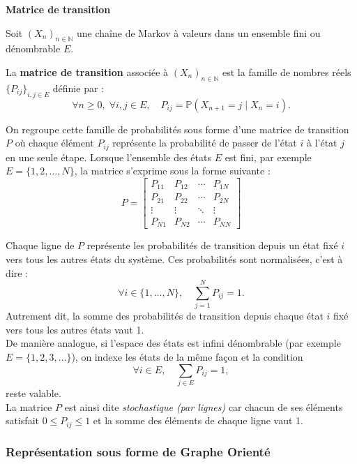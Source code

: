 \documentclass{article}
\begin{document}
\noindent\textbf{Matrice de transition}
\begin{leftbar}
Soit $(X_n)_{n \in \mathbb{N}}$ une chaîne de Markov à valeurs dans un ensemble fini ou dénombrable $E$.

La \textbf{matrice de transition} associée à $(X_n)_{n \in \mathbb{N}}$ est la famille de nombres réels $\{P_{ij}\}_{i,j \in E}$ définie par :
\[
\forall n \geq 0,\; \forall i,j \in E,\quad P_{ij} = \mathbb{P}(X_{n+1} = j \mid X_n = i).
\]

On regroupe cette famille de probabilités sous forme d'une matrice de transition $P$ où chaque élément $P_{ij}$ représente la probabilité de passer de l'état $i$ à l'état $j$ en une seule étape.
Lorsque l'ensemble des états $E$ est fini, par exemple $E = \{1, 2, \dots, N\}$, la matrice s'exprime sous la forme suivante :
\[
P = \begin{bmatrix}
P_{11} & P_{12} & \cdots & P_{1N}\\[1mm]
P_{21} & P_{22} & \cdots & P_{2N}\\[1mm]
\vdots & \vdots & \ddots & \vdots\\[1mm]
P_{N1} & P_{N2} & \cdots & P_{NN}
\end{bmatrix}
\]
\end{leftbar}

Chaque ligne de $P$ représente les probabilités de transition depuis un état fixé $i$ vers tous les autres états du système. Ces probabilités sont normalisées, c'est à dire :
\[
\forall i \in \{1, \dots, N\}, \quad \sum_{j=1}^{N} P_{ij} = 1.
\]
Autrement dit, la somme des probabilités de transition depuis chaque état $i$ fixé vers tous les autres états vaut 1. \\

De manière analogue, si l'espace des états est infini dénombrable (par exemple $E = \{1, 2, 3, \dots\}$), on indexe les états de la même façon et la condition
\[
\forall i \in E, \quad \sum_{j \in E} P_{ij} = 1,
\]
reste valable. \\

La matrice $P$ est ainsi dite \emph{stochastique (par lignes)} car chacun de ses éléments satisfait $0 \leq P_{ij} \leq 1$ et la somme des éléments de chaque ligne vaut 1.

\subsubsection{Représentation sous forme de Graphe Orienté}
\label{subsubsec: Représentation sous forme de graphe orienté}
\end{document}
